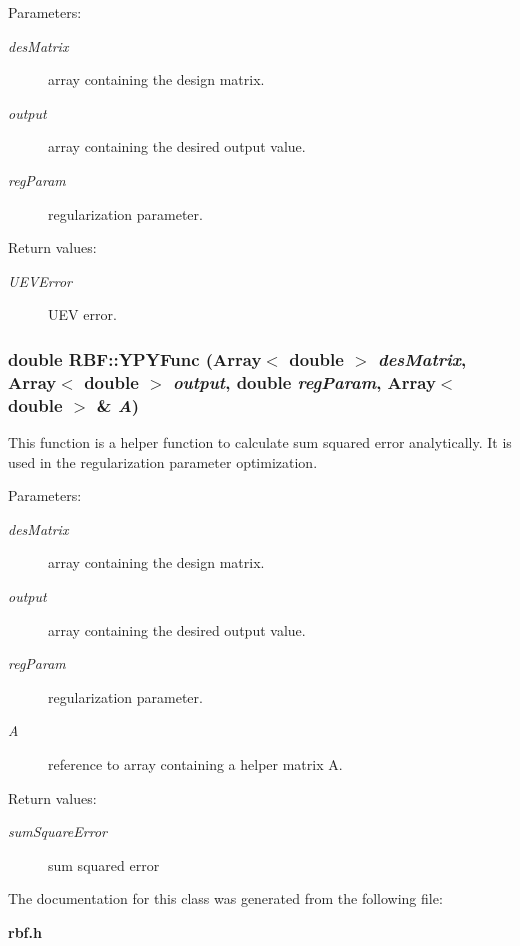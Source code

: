 \begin{Desc}
\item[Parameters:]
\begin{description}
\item[{\em des\-Matrix}]array containing the design matrix. \item[{\em output}]array containing the desired output value. \item[{\em reg\-Param}]regularization parameter. \end{description}
\end{Desc}
\begin{Desc}
\item[Return values:]
\begin{description}
\item[{\em UEVError}]UEV error.\end{description}
\end{Desc}
\subsubsection{\setlength{\rightskip}{0pt plus 5cm}double RBF::YPYFunc (Array$<$ double $>$ {\em des\-Matrix}, Array$<$ double $>$ {\em output}, double {\em reg\-Param}, Array$<$ double $>$ \& {\em A})\hspace{0.3cm}{\tt  [static]}}\label{classRBF_e7}


This function is a helper function to calculate sum squared error analytically. It is used in the regularization parameter optimization. 

\begin{Desc}
\item[Parameters:]
\begin{description}
\item[{\em des\-Matrix}]array containing the design matrix. \item[{\em output}]array containing the desired output value. \item[{\em reg\-Param}]regularization parameter. \item[{\em A}]reference to array containing a helper matrix A. \end{description}
\end{Desc}
\begin{Desc}
\item[Return values:]
\begin{description}
\item[{\em sum\-Square\-Error}]sum squared error\end{description}
\end{Desc}


The documentation for this class was generated from the following file:\begin{CompactItemize}
\item 
{\bf rbf.h}\end{CompactItemize}
